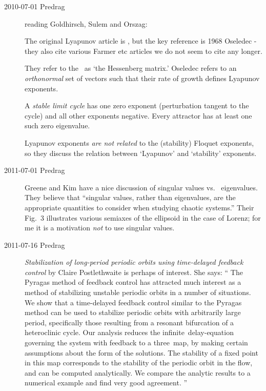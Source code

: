 \begin{description}
\item[2010-07-01 Predrag] reading
Goldhirsch, Sulem and Orszag:

The original Lyapunov article is ,
but the key reference is 1968 Oseledec -
they also cite various Farmer etc articles we do not seem to
cite any longer.

They refer to the \stabmat\ as `the Hessenberg matrix.'
    										\inCB
Oseledec refers to an {\em orthonormal} set of vectors such
that their rate of growth defines Lyapunov exponents.

A \emph{stable limit cycle} has one zero exponent   \inCB
(perturbation tangent to the
cycle) and all other exponents negative.
Every attractor has at least one such zero eigenvalue.

Lyapunov exponents \emph{are not related} to the (stability)
Floquet exponents, so they discuss the relation between
`Lyapunov' and `stability' exponents.
						\inCB

\item[2011-07-01 Predrag]
Greene and Kim have a nice discussion of singular
values vs. \jacobianM\ eigenvalues. They believe that ``singular values,
rather than eigenvalues, are the appropriate quantities to consider
when studying chaotic systems.'' Their Fig.~3 illustrates various semiaxes
of the ellipsoid in the case of Lorenz; for me it is a motivation {\em not}
to use singular values.
						\inCB

\item[2011-07-16 Predrag]
{\em Stabilization of long-period periodic orbits
    using time-delayed feedback control} by Claire
    Postlethwaite
is perhaps of interest. She says: ``
The Pyragas method of feedback control has attracted much interest as a
method of stabilizing unstable periodic orbits in a number of situations.
We show that a time-delayed feedback control similar to the Pyragas
method can be used to stabilize periodic orbits with arbitrarily large
period, specifically those resulting from a resonant bifurcation of a
heteroclinic cycle. Our analysis reduces the infinite\dmn\
delay-equation governing the system with feedback to a three\dmn\
map, by making certain assumptions about the form of the solutions. The
stability of a fixed point in this map corresponds to the stability of
the periodic orbit in the flow, and can be computed analytically. We
compare the analytic results to a numerical example and find very good
agreement.
''







\end{description}
